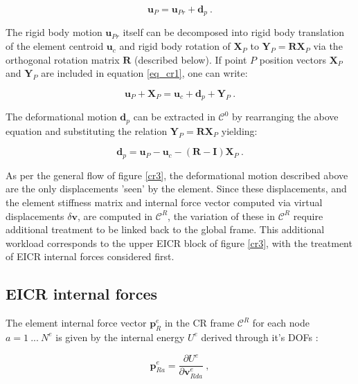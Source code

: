 \begin{equation} 
\mathbf{u}_P = 
\mathbf{u}_{Pr} + \mathbf{d}_p
\label{eq_cr1}\ .
\end{equation}

The rigid body motion $\mathbf{u}_{Pr}$ itself can be decomposed into rigid body translation of the element centroid $\mathbf{u}_c$ and rigid body rotation of $\mathbf{X}_P$ to $\mathbf{Y}_P = \mathbf{R} \mathbf{X}_P$ via the orthogonal rotation matrix $\mathbf{R}$ (described below). If point $P$ position vectors $\mathbf{X}_P$ and $\mathbf{Y}_P$ are included in equation \ref{eq_cr1}, one can write:

\begin{equation} 
\mathbf{u}_P + \mathbf{X}_P = 
\mathbf{u}_{c} + \mathbf{d}_p + \mathbf{Y}_P
\label{eq_cr2}\ .
\end{equation}

The deformational motion $\mathbf{d}_p$ can be extracted in $\mathscr{C}^0$ by rearranging the above equation and substituting the relation $\mathbf{Y}_P = \mathbf{R} \mathbf{X}_P$ yielding:

\begin{equation} 
\mathbf{d}_p = 
\mathbf{u}_P - \mathbf{u}_{c} - (\mathbf{R} - \mathbf{I}) \mathbf{X}_P 
\label{eq_cr3}\ .
\end{equation}

As per the general flow of figure \ref{cr3}, the deformational motion described above are the only displacements 'seen' by the element. Since these displacements, and the element stiffness matrix and internal force vector computed via virtual displacements $\delta \mathbf{v}$, are computed in $\mathscr{C}^R$, the variation of these in $\mathscr{C}^R$ require additional treatment to be linked back to the global frame. This additional workload corresponds to the upper EICR block of figure \ref{cr3}, with the treatment of EICR internal forces considered first.

\subsection{EICR internal forces}
The element internal force vector $\mathbf{p}_R^e$ in the CR frame $\mathscr{C}^R$ for each node $a = 1\ ...\ N^e$ is given by the internal energy $U^e$ derived through it's DOFs \cite{felippa2000systematic}:

\begin{equation} 
\mathbf{p}_{Ra}^e = 
\frac{\partial U^e}{\partial \mathbf{v}_{Rda}^e}
\label{eq_cr4}\ ,
\end{equation}

